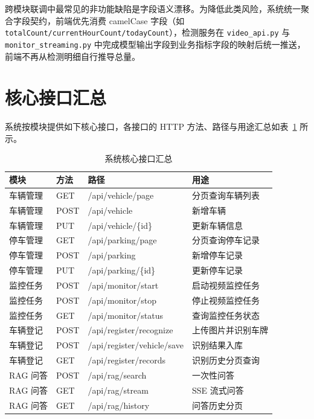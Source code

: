 \documentclass{wzuthesis} %
\begin{document}
跨模块联调中最常见的非功能缺陷是字段语义漂移。为降低此类风险，系统统一聚合字段契约，前端优先消费 camelCase 字段（如 \texttt{totalCount/currentHourCount/todayCount}），检测服务在 \texttt{video\_api.py} 与 \texttt{monitor\_streaming.py} 中完成模型输出字段到业务指标字段的映射后统一推送，前端不再从检测明细自行推导总量。

\section{核心接口汇总}

系统按模块提供如下核心接口，各接口的 HTTP 方法、路径与用途汇总如表~\ref{tab:api-summary} 所示。

\begin{table}[H]
\centering
\footnotesize
\caption{系统核心接口汇总}
\label{tab:api-summary}
\begin{tabular}{|p{2.0cm}|p{1.2cm}|p{4.5cm}|p{4.5cm}|}
\hline
模块 & 方法 & 路径 & 用途 \\
\hline
车辆管理 & GET & /api/vehicle/page & 分页查询车辆列表 \\
\hline
车辆管理 & POST & /api/vehicle & 新增车辆 \\
\hline
车辆管理 & PUT & /api/vehicle/\{id\} & 更新车辆信息 \\
\hline
停车管理 & GET & /api/parking/page & 分页查询停车记录 \\
\hline
停车管理 & POST & /api/parking & 新增停车记录 \\
\hline
停车管理 & PUT & /api/parking/\{id\} & 更新停车记录 \\
\hline
监控任务 & POST & /api/monitor/start & 启动视频监控任务 \\
\hline
监控任务 & POST & /api/monitor/stop & 停止视频监控任务 \\
\hline
监控任务 & GET & /api/monitor/status & 查询监控任务状态 \\
\hline
车辆登记 & POST & /api/register/recognize & 上传图片并识别车牌 \\
\hline
车辆登记 & POST & /api/register/vehicle/save & 识别结果入库 \\
\hline
车辆登记 & GET & /api/register/records & 识别历史分页查询 \\
\hline
RAG 问答 & POST & /api/rag/search & 一次性问答 \\
\hline
RAG 问答 & GET & /api/rag/stream & SSE 流式问答 \\
\hline
RAG 问答 & GET & /api/rag/history & 问答历史分页 \\
\hline
\end{tabular}
\end{table}
\end{document}
